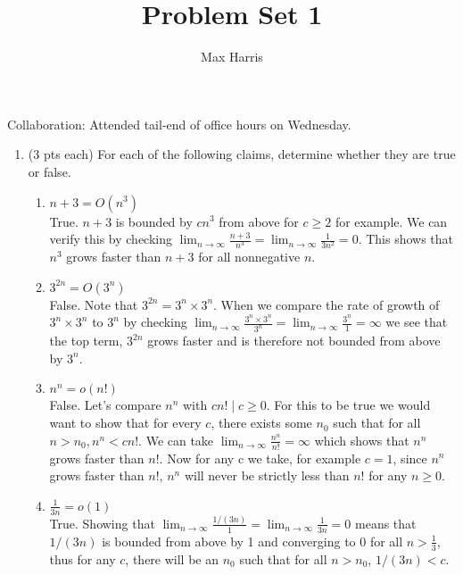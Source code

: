 \documentclass[11pt]{article}
\theoremstyle{definition}
\numberwithin{equation}{section}
\begin{document}
\title{Problem Set 1}
\author{Max Harris}

\maketitle

Collaboration: Attended tail-end of office hours on Wednesday.

\begin{enumerate}
	\item (3 pts each) For each of the following claims, determine whether they are true or false.
	\begin{enumerate}
	
		\item $n+3 = O(n^3)$ \\
		True. $n+3$ is bounded by $cn^3$ from above for $c\geq2$ for example. We can verify this by checking $\lim_{n \rightarrow \infty} \frac{n+3}{n^3} = \lim_{n \rightarrow \infty} \frac{1}{3n^2} = 0$. This shows that $n^3$ grows faster than $n+3$ for all nonnegative $n$.\\
		
		\item  $3^{2n} = O(3^n)$ \\
		False. Note that $3^{2n} = 3^n \times 3^n$. When we compare the rate of growth of $3^n \times 3^n$ to $3^n$ by checking $\lim_{n \rightarrow \infty} \frac{3^{n} \times 3^n}{3^n} = \lim_{n \rightarrow \infty} \frac{3^n}{1} = \infty$ we see that the top term, $3^{2n}$ grows faster and is therefore not bounded from above by $3^n$. \\
		
		\item $n^n = o(n!)$ \\
		False. Let's compare $n^n$ with $cn! \mid c\geq0$. For this to be true we would want to show that for every $c$, there exists some $n_0$ such that for all $n > n_0, n^n < cn!$. We can take $\lim_{n \rightarrow \infty} \frac{n^n}{n!} = \infty $ which shows that $n^n$ grows faster than $n!$. Now for any c we take, for example $c=1$, since $n^n$ grows faster than $n!$, $n^n$ will never be strictly less than $n!$ for any $n \geq 0$.\\
		
		\item $\frac{1}{3n} = o(1)$ \\
		True. Showing that $\lim_{n \rightarrow \infty} \frac{1/(3n)}{1} = \lim_{n \rightarrow \infty} \frac{1}{3n} = 0$ means that $1/(3n)$ is bounded from above by 1 and converging to 0 for all $n>\frac{1}{3}$, thus for any $c$, there will be an $n_0$ such that for all $n > n_0$, $1/(3n) < c$.\\
		

\end{enumerate}
\end{enumerate}
\end{document}
